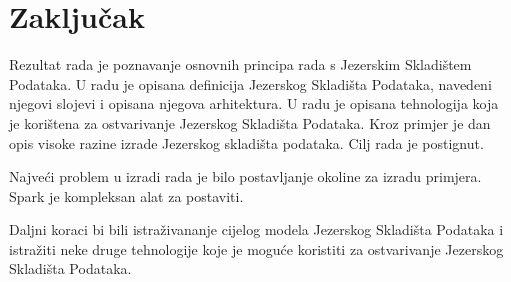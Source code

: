 \chapter{Zaključak} \label{chapter:zakljucak}

Rezultat rada je poznavanje osnovnih principa rada s Jezerskim Skladištem
Podataka. U radu je opisana definicija Jezerskog Skladišta Podataka, navedeni
njegovi slojevi i opisana njegova arhitektura. U radu je opisana tehnologija
koja je korištena za ostvarivanje Jezerskog Skladišta Podataka. Kroz primjer
je dan opis visoke razine izrade Jezerskog skladišta podataka. Cilj rada je
postignut.

Najveći problem u izradi rada je bilo postavljanje okoline za izradu primjera.
Spark je kompleksan alat za postaviti.

Daljni koraci bi bili istraživananje cijelog modela Jezerskog Skladišta Podataka
i istražiti neke druge tehnologije koje je moguće koristiti za ostvarivanje
Jezerskog Skladišta Podataka.
